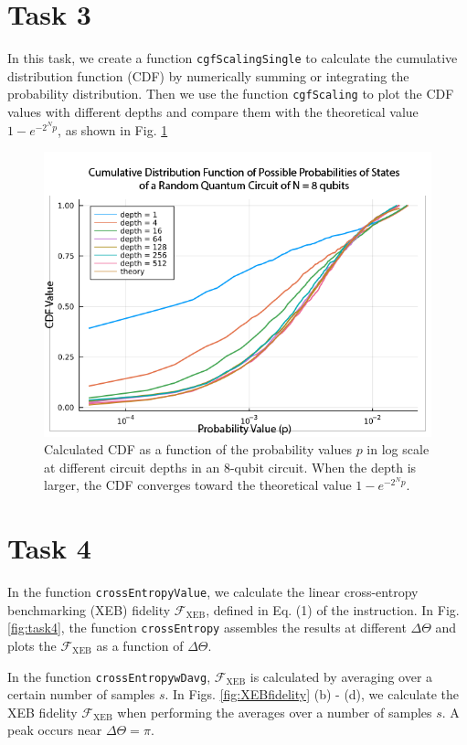 \documentclass[12pt]{article}
\begin{document}
\section*{Task 3}

In this task, we create a function \texttt{cgfScalingSingle} to calculate the cumulative distribution function (CDF) by numerically summing or integrating the probability distribution. Then we use the function \texttt{cgfScaling} to plot the CDF values with different depths and compare them with the theoretical value $1-e^{-2^Np}$, as shown in Fig. \ref{fig:cdf}

\begin{figure}
	\centering
	\includegraphics [width=0.8\linewidth] {figures/Task3}
	\caption{
		Calculated CDF as a function of the probability values $p$ in log scale at different circuit depths in an 8-qubit circuit. When the depth is larger, the CDF converges toward the theoretical value $1- e^{-2^Np}$.
	}
	\label{fig:cdf}
\end{figure}

\section*{Task 4}

In the function \texttt{crossEntropyValue}, we calculate the linear cross-entropy benchmarking (XEB) fidelity $\mathcal{F}_\mathrm{XEB}$, defined in Eq. (1) of the instruction. In Fig. \ref{fig:task4}, the function \texttt{crossEntropy} assembles the results at different $\Delta \Theta$ and plots the $\mathcal{F}_\mathrm{XEB}$ as a function of $\Delta \Theta$.

In the function \texttt{crossEntropywDavg}, $\mathcal{F}_\mathrm{XEB}$ is calculated by averaging over a certain number of samples $s$. In Figs. \ref{fig:XEBfidelity} (b) - (d), we calculate the XEB fidelity $\mathcal{F}_\mathrm{XEB}$ when performing the averages over a number of samples $s$. A peak occurs near $\Delta \Theta=\pi$.
\end{document}
